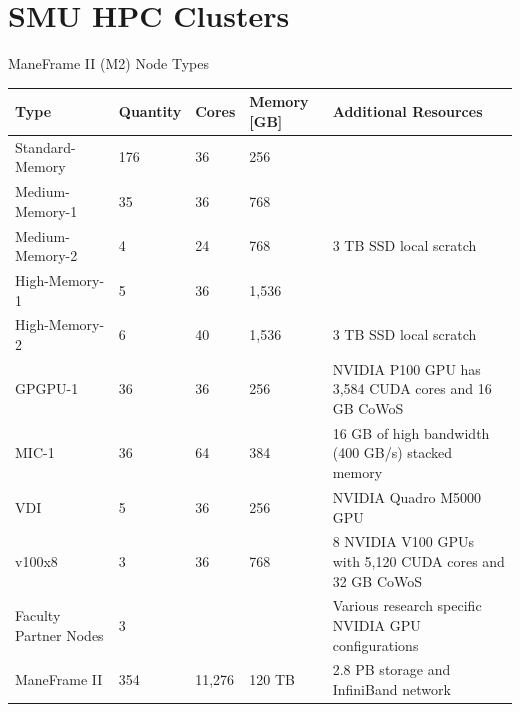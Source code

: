 \section{SMU HPC Clusters}

\begin{frame}{ManeFrame II (M2) Node Types}
\begin{table}
\tiny
\begin{tabular}{lllll}
\toprule
Type & Quantity & Cores & Memory [GB] & Additional Resources\\
\midrule
Standard-Memory & 176 & 36 & 256 & \\
Medium-Memory-1 & 35 & 36 & 768 & \\
Medium-Memory-2 & 4 & 24 & 768 & 3 TB SSD local scratch\\
High-Memory-1 & 5 & 36 & 1,536 & \\
High-Memory-2 & 6 & 40 & 1,536 & 3 TB SSD local scratch\\
GPGPU-1 & 36 & 36 & 256 & NVIDIA P100 GPU has 3,584 CUDA cores and 16 GB CoWoS\\
MIC-1 & 36 & 64 & 384 & 16 GB of high bandwidth (400 GB/s) stacked memory\\
VDI & 5 & 36 & 256 & NVIDIA Quadro M5000 GPU\\
v100x8 & 3 & 36 & 768 & 8 NVIDIA V100 GPUs with 5,120 CUDA cores and 32 GB CoWoS\\
Faculty Partner Nodes & 3 &  &  & Various research specific NVIDIA GPU configurations\\
\midrule
ManeFrame II & 354 & 11,276 & 120 TB & 2.8 PB storage and InfiniBand network\\
\bottomrule
\end{tabular}
\end{table}
\end{frame}

